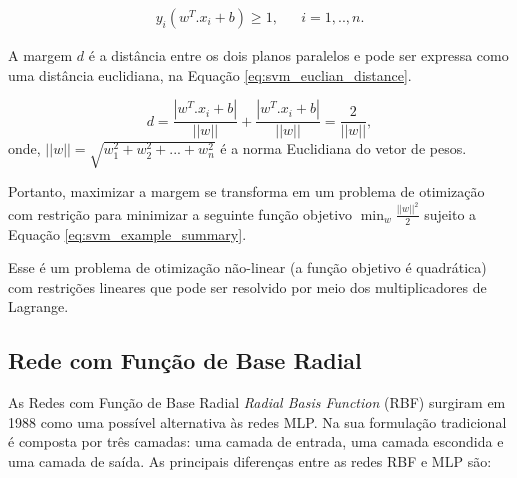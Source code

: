 \begin{eqnarray}
\label{eq:svm_example_summary}
y_i (w^T.x_i + b) \geq 1 ,&& i=1,..,n .
\end{eqnarray}

A margem $d$ \label{symbol:distanciaplanos} é a distância entre os dois planos paralelos e pode ser expressa como uma distância euclidiana, na Equação \ref{eq:svm_euclian_distance}.

\begin{equation}
\label{eq:svm_euclian_distance}
d = \frac{| w^T.x_i + b |}{|| w ||} + \frac{| w^T.x_i + b |}{|| w ||} = \frac{2}{|| w ||} ,
\end{equation}
onde, $||w|| = \sqrt{w_1^2 + w_2^2 + ... + w_n^2}$ é a norma Euclidiana do vetor de pesos.

Portanto, maximizar a margem se transforma em um problema de otimização com restrição para minimizar a seguinte função objetivo $\min_w \frac{||w||^2}{2}$ sujeito a Equação \ref{eq:svm_example_summary}.

Esse é um problema de otimização não-linear (a função objetivo é quadrática) com restrições lineares que pode ser resolvido por meio dos multiplicadores de Lagrange.

\subsection{Rede com Função de Base Radial}

As Redes com Função de Base Radial \textit{Radial Basis Function }(RBF) surgiram em 1988 como uma possível alternativa às redes MLP. Na sua formulação tradicional é composta por três camadas: uma camada de entrada, uma camada escondida e uma camada de saída. As principais diferenças entre as redes RBF e MLP são:

